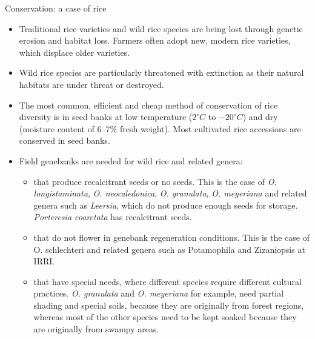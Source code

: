 \documentclass[11pt,ignorenonframetext,aspectratio=169]{beamer}
\providecommand{\tightlist}{%
  \setlength{\itemsep}{0pt}\setlength{\parskip}{0pt}}
\begin{document}
\begin{frame}{Conservation: a case of rice}
\protect\hypertarget{conservation-a-case-of-rice}{}
\footnotesize

\begin{itemize}
\tightlist
\item
  Traditional rice varieties and wild rice species are being lost
  through genetic erosion and habitat loss. Farmers often adopt new,
  modern rice varieties, which displace older varieties.
\item
  Wild rice species are particularly threatened with extinction as their
  natural habitats are under threat or destroyed.
\item
  The most common, efficient and cheap method of conservation of rice
  diversity is in seed banks at low temperature (\(2^\circ C\) to
  \(-20^\circ C\)) and dry (moisture content of 6--7\% fresh weight).
  Most cultivated rice accessions are conserved in seed banks.
\item
  Field genebanks are needed for wild rice and related genera:

  \begin{itemize}
  \tightlist
  \item
    \footnotesize that produce recalcitrant seeds or no seeds. This is
    the case of \emph{O. longistaminata}, \emph{O. neocaledonica},
    \emph{O. granulata}, \emph{O. meyeriana} and related genera such as
    \emph{Leersia}, which do not produce enough seeds for storage.
    \emph{Porteresia coarctata} has recalcitrant seeds.
  \item
    that do not flower in genebank regeneration conditions. This is the
    case of O. schlechteri and related genera such as Potamophila and
    Zizaniopsis at IRRI.
  \item
    that have special needs, where different species require different
    cultural practices. \emph{O. granulata} and \emph{O. meyeriana} for
    example, need partial shading and special soils, because they are
    originally from forest regions, whereas most of the other species
    need to be kept soaked because they are originally from swampy
    areas.
  \end{itemize}
\end{itemize}
\end{frame}
\end{document}
